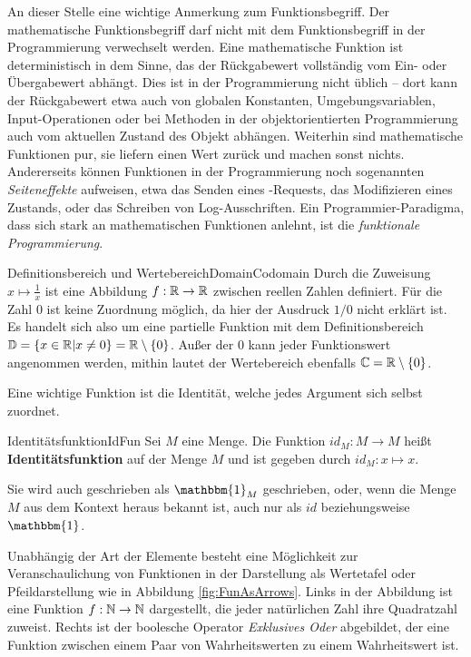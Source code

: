 An dieser Stelle eine wichtige Anmerkung zum Funktionsbegriff. Der mathematische Funktionsbegriff darf nicht mit dem Funktionsbegriff in der Programmierung verwechselt werden. Eine mathematische Funktion ist deterministisch in dem Sinne, das der Rückgabewert vollständig vom Ein- oder Übergabewert abhängt. Dies ist in der Programmierung nicht üblich -- dort kann der Rückgabewert etwa auch von globalen Konstanten, Umgebungsvariablen, Input-Operationen oder bei Methoden in der objektorientierten Programmierung auch vom aktuellen Zustand des Objekt abhängen. Weiterhin sind mathematische Funktionen pur, sie liefern einen Wert zurück und machen sonst nichts. Andererseits können Funktionen in der Programmierung noch sogenannten \emph{Seiteneffekte} aufweisen, etwa das Senden eines -Requests, das Modifizieren eines Zustands, oder das Schreiben von Log-Ausschriften. Ein Programmier-Paradigma, dass sich stark an mathematischen Funktionen anlehnt, ist die \emph{funktionale Programmierung}.

\begin{example}{Definitionsbereich und Wertebereich}{DomainCodomain}
    Durch die Zuweisung $x\mapsto\frac{1}{x}$ ist eine Abbildung $f: \mathbb{R} \to \mathbb{R}$ zwischen reellen Zahlen definiert. Für die Zahl $0$ ist keine Zuordnung möglich, da hier der Ausdruck $1/0$ nicht erklärt ist. Es handelt sich also um eine partielle Funktion mit dem Definitionsbereich $\mathbb{D} = \lbrace x \in \mathbb{R} | x \ne 0 \rbrace = \mathbb{R} \setminus \lbrace 0 \rbrace$. Außer der $0$ kann jeder Funktionswert angenommen werden, mithin lautet der Wertebereich ebenfalls $\mathbb{C} = \mathbb{R} \setminus \lbrace 0 \rbrace$.
\end{example}

Eine wichtige Funktion ist die Identität, welche jedes Argument sich selbst zuordnet.

\begin{definition}{Identitätsfunktion}{IdFun}
    Sei $M$ eine Menge. Die Funktion $id_M: M \to M$ heißt \textbf{Identitätsfunktion} auf der Menge $M$ und ist gegeben durch $id_M: x \mapsto x$.
\end{definition}

Sie wird auch geschrieben als $\mathbbm{1}_M$ geschrieben, oder, wenn die Menge $M$ aus dem Kontext heraus bekannt ist, auch nur als $id$ beziehungsweise $\mathbbm{1}$.

Unabhängig der Art der Elemente besteht eine Möglichkeit zur Veranschaulichung von Funktionen in der Darstellung als Wertetafel oder Pfeildarstellung wie in Abbildung \ref{fig:FunAsArrows}. Links in der Abbildung ist eine Funktion $f: \mathbb{N} \to \mathbb{N}$ dargestellt, die jeder natürlichen Zahl ihre Quadratzahl zuweist. Rechts ist der boolesche Operator \emph{Exklusives Oder} abgebildet, der eine Funktion zwischen einem Paar von Wahrheitswerten zu einem Wahrheitswert ist.

